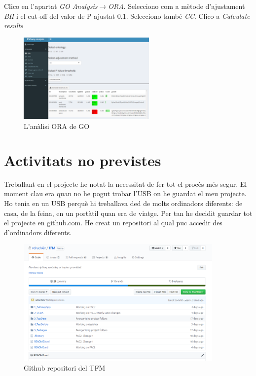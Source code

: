 \documentclass[]{article}
\begin{document}
Clico en l'apartat \textit{GO Analysis}$\rightarrow$\textit{ORA}. Selecciono com a mètode d'ajustament \textit{BH} i el cut-off del valor de P ajustat 0.1. Selecciono també \textit{CC}. Clico a \textit{Calculate results}
\begin{figure}[H]
\centering
\includegraphics[width=0.6\textwidth]{Estudi1_Fig13_GO.png} 
\caption{L'anàlisi ORA de GO}
\end{figure}


\section{Activitats no previstes}

Treballant en el projecte he notat la necessitat de fer tot el procès més segur. El moment clau era quan no he pogut trobar l'USB on he guardat el meu projecte. Ho tenia en un USB perquè hi treballava ded de molts ordinadors diferents: de casa, de la feina, en un portàtil quan era de viatge. Per tan he decidit guardar tot el projecte en github.com. He creat un repositori al qual puc accedir des d'ordinadors diferents.

\begin{figure}[H]
\centering
\includegraphics[width=0.9\textwidth]{GitHub.png} 
\caption{Github repositori del TFM}
\end{figure}
\end{document}
